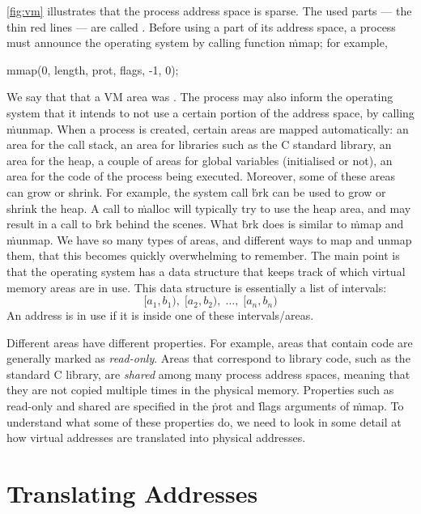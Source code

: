 \autoref{fig:vm} illustrates that the process address space is sparse.
The used parts --- the thin red lines --- are called .
Before using a part of its address space,
  a process must announce the operating system by calling function \.{mmap};
for example,
\begin{ccode}
  mmap(0, length, prot, flags, -1, 0);
\end{ccode}
We say that that a VM area was .
The process may also inform the operating system that it intends
  to not use a certain portion of the address space,
  by calling \.{munmap}.
When a process is created,
  certain areas are mapped automatically:
  an area for the call stack,
  an area for libraries such as the C standard library,
  an area for the heap,
  a couple of areas for global variables (initialised or not),
  an area for the code of the process being executed.
Moreover, some of these areas can grow or shrink.
For example,
  the system call \.{brk} can be used to grow or shrink the heap.
A call to \.{malloc} will typically try to use the heap area,
  and may result in a call to \.{brk} behind the scenes.
What \.{brk} does is similar to \.{mmap} and \.{munmap}.
We have so many types of areas,
  and different ways to map and unmap them,
  that this becomes quickly overwhelming to remember.
The main point is that the operating system has a data structure
  that keeps track of which virtual memory areas are in use.
This data structure is essentially a list of intervals:
\[
  [a_1,b_1),\; [a_2,b_2),\;\ldots,\;[a_n,b_n)
\]
An address is in use if it is inside one of these intervals/areas.

\smallskip

Different areas have different properties.
For example, areas that contain code are generally marked as \emph{read-only}.
Areas that correspond to library code,
  such as the standard C library,
  are \emph{shared} among many process address spaces,
    meaning that they are not copied multiple times in the physical memory.
Properties such as read-only and shared are specified
  in the \.{prot} and \.{flags} arguments of \.{mmap}.
To understand what some of these properties do,
  we need to look in some detail at how virtual addresses
  are translated into physical addresses.

\section{Translating Addresses}

